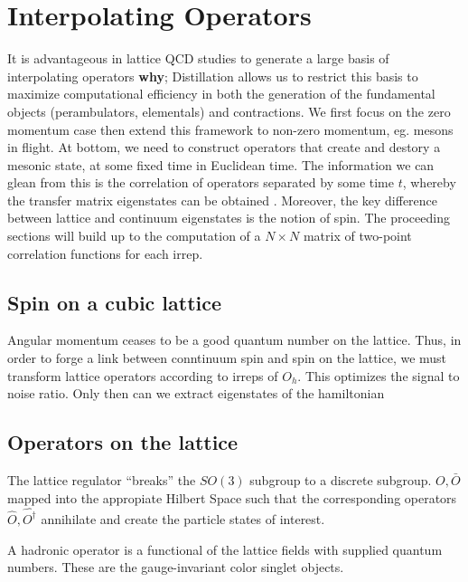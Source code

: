 
\chapter{Interpolating Operators}
\label{sec:ops}

It is advantageous in lattice QCD studies to generate a large basis of interpolating operators \textbf{why}; Distillation allows us to restrict this basis to maximize computational efficiency in both the generation of the fundamental objects (perambulators, elementals) and contractions. We first focus on the zero momentum case then extend this framework to non-zero momentum, eg. mesons in flight. At bottom, we need to construct operators that create and destory a mesonic state, at some fixed time in Euclidean time. The information we can glean from this is the correlation of operators separated by some time $t$, whereby the transfer matrix eigenstates can be obtained . Moreover, the key difference between lattice and continuum eigenstates is the notion of spin. The proceeding sections will build up to the computation of a $N \times N$ matrix of two-point correlation functions for each irrep. 

\section{Spin on a cubic lattice}
Angular momentum ceases to be a good quantum number on the lattice. Thus, in order to forge a link between conntinuum spin and spin on the lattice, we must transform lattice operators according to irreps of $O_h$. This optimizes the signal to noise ratio. Only then can we extract eigenstates of the hamiltonian 
\section{Operators on the lattice}
The lattice regulator ``breaks'' the $SO(3)$ subgroup to a discrete subgroup. 
$O,\bar{O}$ mapped into the appropiate Hilbert Space such that the corresponding operators $\hat{O} ,\hat{O^\dagger}$  annihilate and create the particle states of interest. 

A hadronic operator is a functional of the lattice fields with supplied quantum numbers. These are the gauge-invariant color singlet objects. 

